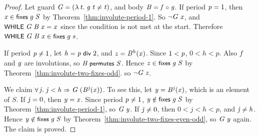 \documentclass[sigplan,screen]{acmart}
\renewcommand{\HOLinline}[1]{\ensuremath{#1}} %
\renewcommand{\HOLConst}[1]{{\fontsize{9pt}{1em}\selectfont\textsf{\upshape #1}}}
\renewcommand{\HOLNumLit}[1]{{\selectfont\textrm{\upshape #1}}} %
\renewcommand{\HOLSymConst}[1]{{\fontsize{9pt}{1em}\selectfont\textsf{\upshape #1}}}
\begin{document}
\begin{proof}
Let guard \HOLinline{\HOLFreeVar{G}\;\HOLSymConst{=}\;(\HOLTokenLambda{}\HOLBoundVar{t}.\;\HOLFreeVar{g}\;\HOLBoundVar{t}\;\HOLSymConst{\HOLTokenNotEqual{}}\;\HOLBoundVar{t})}, and body \HOLinline{\HOLFreeVar{B}\;\HOLSymConst{=}\;\HOLFreeVar{f}\;\HOLSymConst{\HOLTokenCompose}\;\HOLFreeVar{g}}.
If period \HOLinline{\HOLFreeVar{p}\;\HOLSymConst{=}\;\HOLNumLit{1}},
then \HOLinline{\HOLFreeVar{x}\;\HOLSymConst{\HOLTokenIn{}}\;\HOLConst{fixes}\;\HOLFreeVar{g}\;\HOLFreeVar{S}} by Theorem~\ref{thm:involute-period-1}.
So \HOLinline{\HOLSymConst{\HOLTokenNeg{}}\HOLFreeVar{G}\;\HOLFreeVar{x}},
and \HOLinline{\HOLConst{WHILE}\;\HOLFreeVar{G}\;\HOLFreeVar{B}\;\HOLFreeVar{x}\;\HOLSymConst{=}\;\HOLFreeVar{x}} since the condition is not met at the start.
Therefore \HOLinline{\HOLConst{WHILE}\;\HOLFreeVar{G}\;\HOLFreeVar{B}\;\HOLFreeVar{x}\;\HOLSymConst{\HOLTokenIn{}}\;\HOLConst{fixes}\;\HOLFreeVar{g}\;\HOLFreeVar{s}}.

If period \HOLinline{\HOLFreeVar{p}\;\HOLSymConst{\HOLTokenNotEqual{}}\;\HOLNumLit{1}}, let \HOLinline{\HOLFreeVar{h}\;\HOLSymConst{=}\;\HOLFreeVar{p}\;\HOLConst{\HOLConst{div}}\;\HOLNumLit{2}},
and \HOLinline{\HOLFreeVar{z}\;\HOLSymConst{=}\;\HOLFreeVar{B}\ensuremath{\sp{\HOLFreeVar{h}}(\HOLFreeVar{x})}}.
Since \HOLinline{\HOLNumLit{1}\;\HOLSymConst{\HOLTokenLt{}}\;\HOLFreeVar{p}}, $0 < h < p$.
Also $f$ and \HOLinline{\HOLFreeVar{g}} are involutions, so \HOLinline{\HOLFreeVar{B}\;\HOLConst{\HOLConst{permutes}}\;\HOLFreeVar{S}}.
Hence \HOLinline{\HOLFreeVar{z}\;\HOLSymConst{\HOLTokenIn{}}\;\HOLConst{fixes}\;\HOLFreeVar{g}\;\HOLFreeVar{S}} by Theorem~\ref{thm:involute-two-fixes-odd}.
so \HOLinline{\HOLSymConst{\HOLTokenNeg{}}\HOLFreeVar{G}\;\HOLFreeVar{z}}.

We claim \HOLinline{\HOLSymConst{\HOLTokenForall{}}\HOLBoundVar{j}.\;\HOLBoundVar{j}\;\HOLSymConst{\HOLTokenLt{}}\;\HOLFreeVar{h}\;\HOLSymConst{\HOLTokenImp{}}\;\HOLFreeVar{G}\;(\HOLFreeVar{B}\ensuremath{\sp{\HOLBoundVar{j}}(\HOLFreeVar{x})})}.
To see this, let \HOLinline{\HOLFreeVar{y}\;\HOLSymConst{=}\;\HOLFreeVar{B}\ensuremath{\sp{\HOLFreeVar{j}}(\HOLFreeVar{x})}}, which is an element of $S$.
If \HOLinline{\HOLFreeVar{j}\;\HOLSymConst{=}\;\HOLNumLit{0}}, then \HOLinline{\HOLFreeVar{y}\;\HOLSymConst{=}\;\HOLFreeVar{x}}.
Since period \HOLinline{\HOLFreeVar{p}\;\HOLSymConst{\HOLTokenNotEqual{}}\;\HOLNumLit{1}},
\HOLinline{\HOLFreeVar{y}\;\HOLSymConst{\HOLTokenNotIn{}}\;\HOLConst{fixes}\;\HOLFreeVar{g}\;\HOLFreeVar{S}} by Theorem~\ref{thm:involute-period-1}, so \HOLinline{\HOLFreeVar{G}\;\HOLFreeVar{y}}.
If \HOLinline{\HOLFreeVar{j}\;\HOLSymConst{\HOLTokenNotEqual{}}\;\HOLNumLit{0}}, then $0 < j < h < p$, and \HOLinline{\HOLFreeVar{j}\;\HOLSymConst{\HOLTokenNotEqual{}}\;\HOLFreeVar{h}}.
Hence \HOLinline{\HOLFreeVar{y}\;\HOLSymConst{\HOLTokenNotIn{}}\;\HOLConst{fixes}\;\HOLFreeVar{g}\;\HOLFreeVar{S}} by Theorem~\ref{thm:involute-two-fixes-even-odd},
so \HOLinline{\HOLFreeVar{G}\;\HOLFreeVar{y}} again. The claim is proved.


\end{proof}
\end{document}
